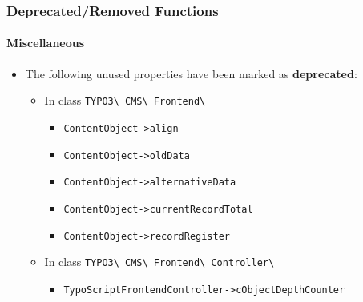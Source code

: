 %

\begin{frame}[fragile]
	\frametitle{Deprecated/Removed Functions}
	\framesubtitle{Miscellaneous}


	\begin{itemize}
		\item The following unused properties have been marked as \textbf{deprecated}:
			\begin{itemize}\small
				\vspace{0.1cm}
				\item In class \texttt{TYPO3\textbackslash
					CMS\textbackslash
					Frontend\textbackslash}
					\begin{itemize}
						\item \texttt{ContentObject->align}
						\item \texttt{ContentObject->oldData}
						\item \texttt{ContentObject->alternativeData}
						\item \texttt{ContentObject->currentRecordTotal}
						\item \texttt{ContentObject->recordRegister}
					\end{itemize}
				\vspace{0.1cm}
				\item In class \texttt{TYPO3\textbackslash
					CMS\textbackslash
					Frontend\textbackslash
					Controller\textbackslash}
					\begin{itemize}
						\item \texttt{TypoScriptFrontendController->cObjectDepthCounter}
					\end{itemize}
			\end{itemize}\normalsize
	\end{itemize}

\end{frame}


